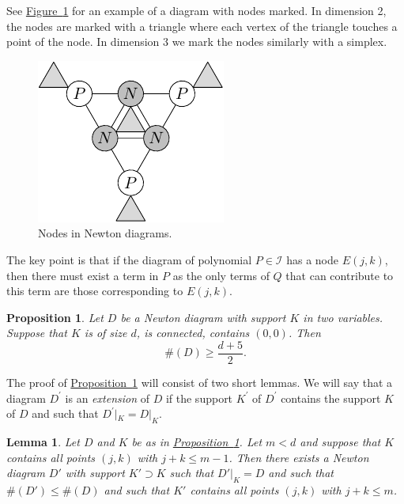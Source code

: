 \documentclass[12pt,openany]{book}
\newcommand{\sI}{{\mathcal{I}}}
\theoremstyle{plain}
\newtheorem{lemma}[thm]{Lemma}
\newtheorem{prop}[thm]{Proposition}
\theoremstyle{remark}
\theoremstyle{definition}
\theoremstyle{exercise}
\theoremstyle{example}
\newcommand{\figureref}[1]{\hyperref[#1]{Figure~\ref*{#1}}}
\newcommand{\propref}[1]{\hyperref[#1]{Proposition~\ref*{#1}}}
\begin{document}
See \figureref{fig:newtonnodes} for an example of a diagram with nodes marked.
In dimension 2, the nodes are marked with a triangle where each vertex of the
triangle touches a point of the node.  In dimension 3 we mark the nodes
similarly with a simplex.

\begin{figure}[h!t]
\begin{center}
\includegraphics{diag10}
\caption{Nodes in Newton diagrams.\label{fig:newtonnodes}}
\end{center}
\end{figure}

The key point is that if the diagram of polynomial $P \in \sI$
has a node $E(j,k)$, then there must exist a term in $P$ as the only 
terms of $Q$ that can contribute to this term are those corresponding to
$E(j,k)$.

\begin{prop}\label{hj:twodim}
Let $D$ be a Newton diagram with support $K$ in two variables.
Suppose that $K$ is of size $d$,
is
connected, contains $(0,0)$. Then
\begin{equation}
\#(D) \geq \frac{d+5}{2}.
\end{equation}
\end{prop}

The proof of \propref{hj:twodim} will consist of two short lemmas.
We will say that a diagram $D^\prime$ is an \emph{extension} of $D$
if the support $K^\prime$ of $D^\prime$ contains the support $K$ of $D$
and such that $D^\prime|_K = D|_K$.

\begin{lemma}\label{hj:thm:filling}
Let $D$ and $K$ be as in \propref{hj:twodim}.  Let $m < d$ and suppose that
$K$ contains all points $(j,k)$ with $j+k \leq m-1$.  Then there exists
a Newton diagram $D'$ with support $K' \supset K$
such that $D' |_K = D$
and such that $\#(D') \leq \#(D)$ and such
that $K'$ 
contains all points $(j,k)$ with $j+k \leq m$.
\end{lemma}
\end{document}
